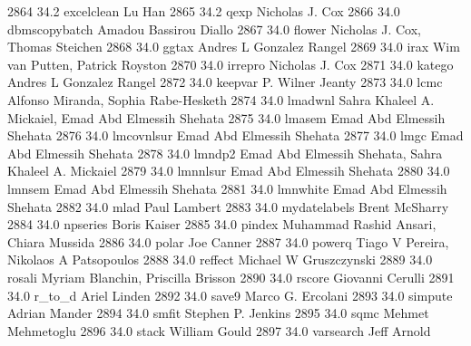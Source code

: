   2864     34.2    excelclean    Lu Han                                  
  2865     34.2    qexp          Nicholas J. Cox                         
  2866     34.0    dbmscopybatch  Amadou Bassirou Diallo                  
  2867     34.0    flower        Nicholas J. Cox, Thomas Steichen        
  2868     34.0    ggtax         Andres L Gonzalez Rangel                
  2869     34.0    irax          Wim van Putten, Patrick Royston         
  2870     34.0    irrepro       Nicholas J. Cox                         
  2871     34.0    katego        Andres L Gonzalez Rangel                
  2872     34.0    keepvar       P. Wilner Jeanty                        
  2873     34.0    lcmc          Alfonso Miranda, Sophia Rabe-Hesketh    
  2874     34.0    lmadwnl       Sahra Khaleel A. Mickaiel, Emad Abd     
                                   Elmessih Shehata                        
  2875     34.0    lmasem        Emad Abd Elmessih Shehata               
  2876     34.0    lmcovnlsur    Emad Abd Elmessih Shehata               
  2877     34.0    lmgc          Emad Abd Elmessih Shehata               
  2878     34.0    lmndp2        Emad Abd Elmessih Shehata, Sahra        
                                   Khaleel A. Mickaiel                     
  2879     34.0    lmnnlsur      Emad Abd Elmessih Shehata               
  2880     34.0    lmnsem        Emad Abd Elmessih Shehata               
  2881     34.0    lmnwhite      Emad Abd Elmessih Shehata               
  2882     34.0    mlad          Paul Lambert                            
  2883     34.0    mydatelabels  Brent McSharry                          
  2884     34.0    npseries      Boris Kaiser                            
  2885     34.0    pindex        Muhammad Rashid Ansari, Chiara Mussida  
  2886     34.0    polar         Joe Canner                              
  2887     34.0    powerq        Tiago V Pereira, Nikolaos A Patsopoulos 
  2888     34.0    reffect       Michael W Gruszczynski                  
  2889     34.0    rosali        Myriam Blanchin, Priscilla Brisson      
  2890     34.0    rscore        Giovanni Cerulli                        
  2891     34.0    r_to_d        Ariel Linden                            
  2892     34.0    save9         Marco G. Ercolani                       
  2893     34.0    simpute       Adrian Mander                           
  2894     34.0    smfit         Stephen P. Jenkins                      
  2895     34.0    sqmc          Mehmet Mehmetoglu                       
  2896     34.0    stack         William Gould                           
  2897     34.0    varsearch     Jeff Arnold                             
